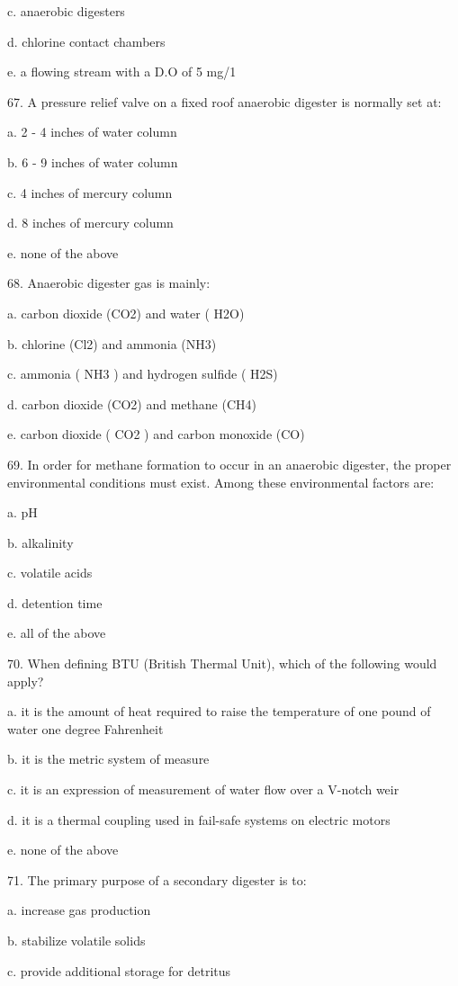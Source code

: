 \documentclass{article}
\begin{document}
c. anaerobic digesters 

d. chlorine contact chambers 

e. a flowing stream with a D.O of 5 mg/1 


67. A pressure relief valve on a fixed roof anaerobic digester is normally set at: 

a. 2 - 4 inches of water column 

b. 6 - 9 inches of water column 

c. 4 inches of mercury column 

d. 8 inches of mercury column 

e. none of the above 


68. Anaerobic digester gas is mainly: 

a. carbon dioxide (CO2) and water ( H2O) 

b. chlorine (Cl2) and ammonia (NH3) 

c. ammonia ( NH3 ) and hydrogen sulfide ( H2S) 

d. carbon dioxide (CO2) and methane (CH4) 

e. carbon dioxide ( CO2 ) and carbon monoxide (CO) 


69. In order for methane formation to occur in an anaerobic digester, the proper environmental conditions must exist. Among these environmental factors are: 

a. pH 

b. alkalinity 

c. volatile acids 

d. detention time 

e. all of the above 


70. When defining BTU (British Thermal Unit), which of the following would apply? 

a. it is the amount of heat required to raise the temperature of one pound of water one degree Fahrenheit 

b. it is the metric system of measure 

c. it is an expression of measurement of water flow over a V-notch weir 

d. it is a thermal coupling used in fail-safe systems on electric motors 

e. none of the above 


71. The primary purpose of a secondary digester is to: 

a. increase gas production 

b. stabilize volatile solids 

c. provide additional storage for detritus 
\end{document}
